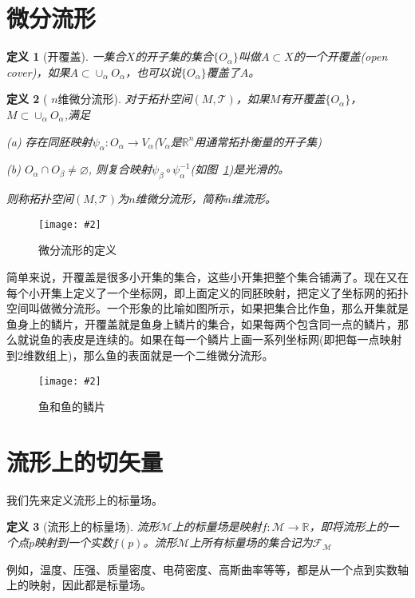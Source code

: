 \documentclass[11pt,a4paper]{ctexbook}
\newcommand{\cpic}[2]{
\begin{center}
\texttt{[image: \#2]}
\end{center}
}
\newcommand{\cpicn}[3]
{
\begin{figure}[H]
\cpic{#1}{#2}
\caption{\color{red}#3\label{#2}}
\end{figure}
}
\newtheorem{definition}{\hspace{2em} 定义}[section]
\begin{document}
\section{微分流形}
\begin{definition}[开覆盖]
  一集合$X$的开子集的集合$\{O_\alpha\}$叫做$A\subset X$的一个开覆盖(open cover)，如果$A\subset \cup_\alpha O_\alpha$，也可以说$\{O_\alpha\}$覆盖了$A$。
\end{definition}
\begin{definition}[ $n$维微分流形]
  
  对于拓扑空间$(M,\mathcal{T})$，如果$M$有开覆盖$\{O_\alpha\}$，$M\subset \cup_\alpha O_\alpha$,满足
  
  (a) 存在同胚映射$\psi_\alpha: O_\alpha \rightarrow V_\alpha$($V_\alpha$是$\mathbb{R}^n$用通常拓扑衡量的开子集)
  
  (b) $O_\alpha \cap O_\beta \ne \varnothing$, 则复合映射$\psi_\beta \circ \psi_\alpha^{-1}$(如图~\ref{manifold})是光滑的。
  
  则称拓扑空间$(M,\mathcal{T})$为$n$维微分流形，简称$n$维流形。
  
\end{definition}
\cpicn{0.5}{manifold}{微分流形的定义}

简单来说，开覆盖是很多小开集的集合，这些小开集把整个集合铺满了。现在又在每个小开集上定义了一个坐标网，即上面定义的同胚映射，把定义了坐标网的拓扑空间叫做微分流形。一个形象的比喻如图所示，如果把集合比作鱼，那么开集就是鱼身上的鳞片，开覆盖就是鱼身上鳞片的集合，如果每两个包含同一点的鳞片，那么就说鱼的表皮是连续的。如果在每一个鳞片上画一系列坐标网(即把每一点映射到2维数组上)，那么鱼的表面就是一个二维微分流形。%
\cpicn{0.4}{fish}{鱼和鱼的鳞片}
\section{流形上的切矢量}
我们先来定义流形上的标量场。
\begin{definition}[流形上的标量场]
  流形$\mathcal{M}$上的标量场是映射$f:\mathcal{M}\rightarrow \mathbb{R}$，即将流形上的一个点$p$映射到一个实数$f(p)$。流形$\mathcal{M}$上所有标量场的集合记为$\mathcal{F}_{\mathcal{M}}$
\end{definition}
例如，温度、压强、质量密度、电荷密度、高斯曲率等等，都是从一个点到实数轴上的映射，因此都是标量场。
\end{document}
